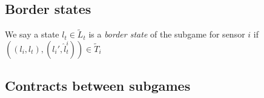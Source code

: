 \subsection{Border states}
We say a state $l_t \in \widetilde{L}_t$ is a \emph{border state} of the subgame for sensor $i$ if $((l_i,l_t),(l_i',\hat{l}_t^i)) \in \widetilde{T}_i$
\subsection{Contracts between subgames}
